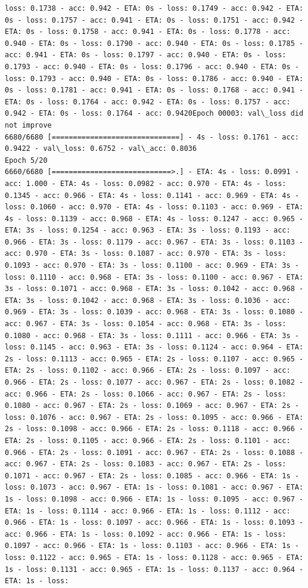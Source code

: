 \documentclass[11pt]{article}
\begin{document}
\begin{Verbatim}[commandchars=\\\{\}]
loss: 0.1738 - acc: 0.942 - ETA: 0s - loss: 0.1749 - acc: 0.942 - ETA: 0s - loss: 0.1757 - acc: 0.941 - ETA: 0s - loss: 0.1751 - acc: 0.942 - ETA: 0s - loss: 0.1758 - acc: 0.941 - ETA: 0s - loss: 0.1778 - acc: 0.940 - ETA: 0s - loss: 0.1790 - acc: 0.940 - ETA: 0s - loss: 0.1785 - acc: 0.941 - ETA: 0s - loss: 0.1797 - acc: 0.940 - ETA: 0s - loss: 0.1793 - acc: 0.940 - ETA: 0s - loss: 0.1796 - acc: 0.940 - ETA: 0s - loss: 0.1793 - acc: 0.940 - ETA: 0s - loss: 0.1786 - acc: 0.940 - ETA: 0s - loss: 0.1781 - acc: 0.941 - ETA: 0s - loss: 0.1768 - acc: 0.941 - ETA: 0s - loss: 0.1764 - acc: 0.942 - ETA: 0s - loss: 0.1757 - acc: 0.942 - ETA: 0s - loss: 0.1764 - acc: 0.9420Epoch 00003: val\_loss did not improve
6680/6680 [==============================] - 4s - loss: 0.1761 - acc: 0.9422 - val\_loss: 0.6752 - val\_acc: 0.8036
Epoch 5/20
6660/6680 [============================>.] - ETA: 4s - loss: 0.0991 - acc: 1.000 - ETA: 4s - loss: 0.0982 - acc: 0.970 - ETA: 4s - loss: 0.1345 - acc: 0.966 - ETA: 4s - loss: 0.1141 - acc: 0.969 - ETA: 4s - loss: 0.1060 - acc: 0.970 - ETA: 4s - loss: 0.1103 - acc: 0.969 - ETA: 4s - loss: 0.1139 - acc: 0.968 - ETA: 4s - loss: 0.1247 - acc: 0.965 - ETA: 3s - loss: 0.1254 - acc: 0.963 - ETA: 3s - loss: 0.1193 - acc: 0.966 - ETA: 3s - loss: 0.1179 - acc: 0.967 - ETA: 3s - loss: 0.1103 - acc: 0.970 - ETA: 3s - loss: 0.1087 - acc: 0.970 - ETA: 3s - loss: 0.1093 - acc: 0.970 - ETA: 3s - loss: 0.1100 - acc: 0.969 - ETA: 3s - loss: 0.1110 - acc: 0.968 - ETA: 3s - loss: 0.1100 - acc: 0.967 - ETA: 3s - loss: 0.1071 - acc: 0.968 - ETA: 3s - loss: 0.1042 - acc: 0.968 - ETA: 3s - loss: 0.1042 - acc: 0.968 - ETA: 3s - loss: 0.1036 - acc: 0.969 - ETA: 3s - loss: 0.1039 - acc: 0.968 - ETA: 3s - loss: 0.1080 - acc: 0.967 - ETA: 3s - loss: 0.1054 - acc: 0.968 - ETA: 3s - loss: 0.1080 - acc: 0.968 - ETA: 3s - loss: 0.1111 - acc: 0.966 - ETA: 3s - loss: 0.1145 - acc: 0.963 - ETA: 3s - loss: 0.1124 - acc: 0.964 - ETA: 2s - loss: 0.1113 - acc: 0.965 - ETA: 2s - loss: 0.1107 - acc: 0.965 - ETA: 2s - loss: 0.1102 - acc: 0.966 - ETA: 2s - loss: 0.1097 - acc: 0.966 - ETA: 2s - loss: 0.1077 - acc: 0.967 - ETA: 2s - loss: 0.1082 - acc: 0.966 - ETA: 2s - loss: 0.1066 - acc: 0.967 - ETA: 2s - loss: 0.1080 - acc: 0.967 - ETA: 2s - loss: 0.1069 - acc: 0.967 - ETA: 2s - loss: 0.1076 - acc: 0.967 - ETA: 2s - loss: 0.1095 - acc: 0.966 - ETA: 2s - loss: 0.1098 - acc: 0.966 - ETA: 2s - loss: 0.1118 - acc: 0.966 - ETA: 2s - loss: 0.1105 - acc: 0.966 - ETA: 2s - loss: 0.1101 - acc: 0.966 - ETA: 2s - loss: 0.1091 - acc: 0.967 - ETA: 2s - loss: 0.1088 - acc: 0.967 - ETA: 2s - loss: 0.1083 - acc: 0.967 - ETA: 2s - loss: 0.1071 - acc: 0.967 - ETA: 2s - loss: 0.1085 - acc: 0.966 - ETA: 1s - loss: 0.1073 - acc: 0.967 - ETA: 1s - loss: 0.1081 - acc: 0.967 - ETA: 1s - loss: 0.1098 - acc: 0.966 - ETA: 1s - loss: 0.1095 - acc: 0.967 - ETA: 1s - loss: 0.1114 - acc: 0.966 - ETA: 1s - loss: 0.1112 - acc: 0.966 - ETA: 1s - loss: 0.1097 - acc: 0.966 - ETA: 1s - loss: 0.1093 - acc: 0.966 - ETA: 1s - loss: 0.1092 - acc: 0.966 - ETA: 1s - loss: 0.1097 - acc: 0.966 - ETA: 1s - loss: 0.1103 - acc: 0.966 - ETA: 1s - loss: 0.1122 - acc: 0.965 - ETA: 1s - loss: 0.1128 - acc: 0.965 - ETA: 1s - loss: 0.1131 - acc: 0.965 - ETA: 1s - loss: 0.1137 - acc: 0.964 - ETA: 1s - loss: 
\end{Verbatim}
\end{document}
